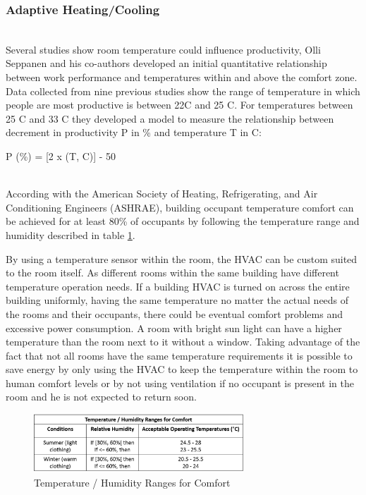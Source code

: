 \subsubsection{Adaptive Heating/Cooling}\label{related:adaptive_heating}\mbox{}\\


Several studies show room temperature could influence productivity, Olli Seppanen and his co-authors developed an initial quantitative relationship between work performance and temperatures within and above the comfort zone\cite{temperature_survey}. Data collected from nine previous studies show the range of temperature in which people are most productive is between 22C and 25 C. For temperatures between 25 C and 33 C they developed a model to measure the relationship between decrement in productivity P in \% and
temperature T in  C: 

P (\%) = [2 x (T, C)] - 50 


\mbox{}\\
According with the American Society of Heating, Refrigerating, and Air Conditioning Engineers (ASHRAE), building occupant temperature comfort can be achieved for at least 80\% of occupants\cite{std_ASHRAE_55} by following the temperature range and humidity described in table \ref{tab_temperature}.

 
By using a temperature sensor within the room, the HVAC can be custom suited to the room itself. As different rooms within the same building have different temperature operation needs. If a building HVAC is turned on across the entire building uniformly, having the same temperature no matter the actual needs of the rooms and their occupants, there could be eventual comfort problems and excessive power consumption. A room with bright sun light can have a higher temperature than the room next to it without a window. Taking advantage of the fact that not all rooms have the same temperature requirements it is possible to save energy by only using the HVAC to keep the temperature within the room to human comfort levels or by not using ventilation if no occupant is present in the room and he is not expected to return soon.




\begin{figure}[h]
\centering
\includegraphics[width=0.7\textwidth]{Figures/tabela_temperatura}
\caption{Temperature / Humidity Ranges for Comfort}
\label{tab_temperature}
\end{figure}



